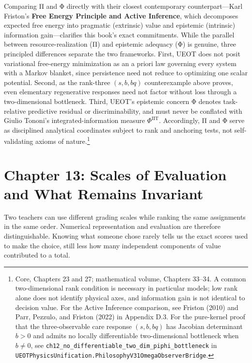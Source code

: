 \documentclass[
  english,
  11pt,
  oneside]{book}
\begin{document}
Comparing Π and Φ directly with their closest contemporary counterpart---Karl Friston's \textbf{Free Energy Principle and Active Inference}, which decomposes expected free energy into pragmatic (extrinsic) value and epistemic (intrinsic) information gain---clarifies this book's exact commitments. While the parallel between resource-realization (Π) and epistemic adequacy (Φ) is genuine, three principled differences separate the two frameworks. First, UEOT does not posit variational free-energy minimization as an a priori law governing every system with a Markov blanket, since persistence need not reduce to optimizing one scalar potential. Second, as the rank-three \((s,b,bq)\) counterexample above proves, even elementary regenerative responses need not factor without loss through a two-dimensional bottleneck. Third, UEOT's epistemic concern Φ denotes task-relative predictive residual or discriminability, and must never be conflated with Giulio Tononi's integrated-information measure \(\Phi^{\mathrm{IIT}}\). Accordingly, Π and Φ serve as disciplined analytical coordinates subject to rank and anchoring tests, not self-validating axioms of nature.\footnote{\hypertarget{ph-note-35}{}Core, Chapters 23 and 27; mathematical volume, Chapters 33--34. A common two-dimensional rank condition is necessary in particular models; low rank alone does not identify physical axes, and information gain is not identical to decision value. For the Active Inference comparison, see Friston (2010) and Parr, Pezzulo, and Friston (2022) in Appendix D.3. For the pure-kernel proof that the three-observable care response \((s,b,bq)\) has Jacobian determinant \(b>0\) and admits no locally differentiable two-dimensional bottleneck when \(b\neq 0\), see \nolinkurl{ch12_no_differentiable_two_dim_piphi_bottleneck} in \nolinkurl{UEOTPhysicsUnification.PhilosophyV31OmegaObserverBridge}.}

\par\endgroup

\chapter{Chapter 13: Scales of Evaluation and What Remains Invariant}\label{ph-ch-13}

Two teachers can use different grading scales while ranking the same assignments in the same order. Numerical representation and evaluation are therefore distinguishable. Knowing what someone chose rarely tells us the exact scores used to make the choice, still less how many independent components of value contributed to a total.
\end{document}

